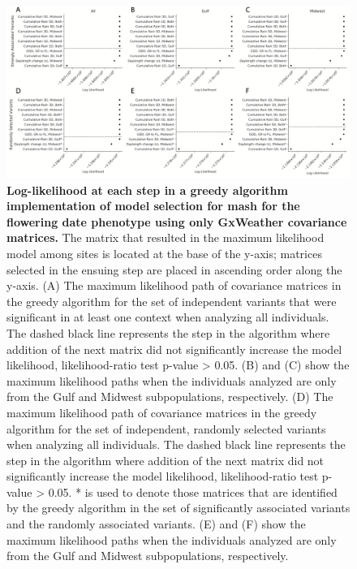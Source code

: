 \documentclass[
  letterpaper,
  DIV=11,
  numbers=noendperiod]{scrartcl}
\begin{document}
\begin{figure}[H]

{\centering \includegraphics{images/RR_Figure2.png}

}

\caption{\textbf{Log-likelihood at each step in a greedy algorithm
implementation of model selection for mash for the flowering date
phenotype using only GxWeather covariance matrices.} The matrix that
resulted in the maximum likelihood model among sites is located at the
base of the y-axis; matrices selected in the ensuing step are placed in
ascending order along the y-axis. (A) The maximum likelihood path of
covariance matrices in the greedy algorithm for the set of independent
variants that were significant in at least one context when analyzing
all individuals. The dashed black line represents the step in the
algorithm where addition of the next matrix did not significantly
increase the model likelihood, likelihood-ratio test p-value
\textgreater{} 0.05. (B) and (C) show the maximum likelihood paths when
the individuals analyzed are only from the Gulf and Midwest
subpopulations, respectively. (D) The maximum likelihood path of
covariance matrices in the greedy algorithm for the set of independent,
randomly selected variants when analyzing all individuals. The dashed
black line represents the step in the algorithm where addition of the
next matrix did not significantly increase the model likelihood,
likelihood-ratio test p-value \textgreater{} 0.05. * is used to denote
those matrices that are identified by the greedy algorithm in the set of
significantly associated variants and the randomly associated variants.
(E) and (F) show the maximum likelihood paths when the individuals
analyzed are only from the Gulf and Midwest subpopulations,
respectively.}

\end{figure}%
\end{document}
